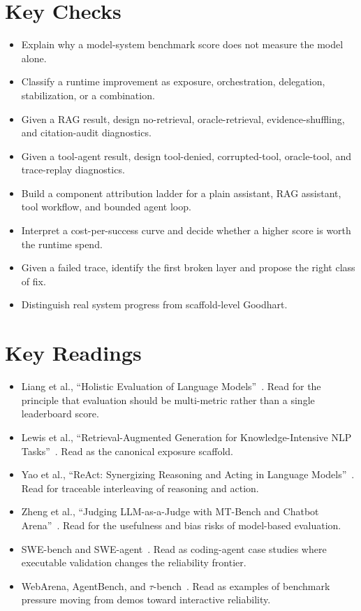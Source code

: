 \section*{Key Checks}

\begin{itemize}
  \item Explain why a model-system benchmark score does not measure the model alone.
  \item Classify a runtime improvement as exposure, orchestration, delegation, stabilization, or a combination.
  \item Given a RAG result, design no-retrieval, oracle-retrieval, evidence-shuffling, and citation-audit diagnostics.
  \item Given a tool-agent result, design tool-denied, corrupted-tool, oracle-tool, and trace-replay diagnostics.
  \item Build a component attribution ladder for a plain assistant, RAG assistant, tool workflow, and bounded agent loop.
  \item Interpret a cost-per-success curve and decide whether a higher score is worth the runtime spend.
  \item Given a failed trace, identify the first broken layer and propose the right class of fix.
  \item Distinguish real system progress from scaffold-level Goodhart.
\end{itemize}

\section*{Key Readings}

\begin{itemize}
  \item Liang et al., ``Holistic Evaluation of Language Models''~\cite{liang2022helm}. Read for the principle that evaluation should be multi-metric rather than a single leaderboard score.
  \item Lewis et al., ``Retrieval-Augmented Generation for Knowledge-Intensive NLP Tasks''~\cite{lewis2020rag}. Read as the canonical exposure scaffold.
  \item Yao et al., ``ReAct: Synergizing Reasoning and Acting in Language Models''~\cite{yao2023react}. Read for traceable interleaving of reasoning and action.
  \item Zheng et al., ``Judging LLM-as-a-Judge with MT-Bench and Chatbot Arena''~\cite{zheng2023judging}. Read for the usefulness and bias risks of model-based evaluation.
  \item SWE-bench and SWE-agent~\cite{jimenez2024swebench,yang2024sweagent}. Read as coding-agent case studies where executable validation changes the reliability frontier.
  \item WebArena, AgentBench, and \(\tau\)-bench~\cite{zhou2023webarena,liu2023agentbench,yao2024taubench}. Read as examples of benchmark pressure moving from demos toward interactive reliability.
\end{itemize}

\flushbottom
